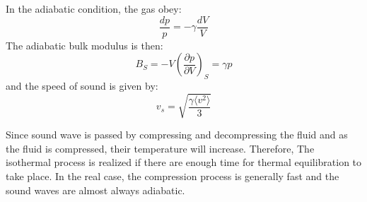 \documentclass{article}
\newcommand{\pfrac}[2]{\frac{\partial #1}{\partial #2}}
\begin{document}
In the adiabatic condition, the gas obey:
\begin{equation}
    \frac{dp}{p} = -\gamma \frac{dV}{V}
\end{equation}
The adiabatic bulk modulus is then:
\begin{equation}
    B_S = -V \left( \pfrac{p}{V} \right)_S = \gamma p
\end{equation}
and the speed of sound is given by:
\begin{equation}
    v_s = \sqrt{\frac{\gamma\langle v^2 \rangle }{3}}    
\end{equation}

Since sound wave is passed by compressing and decompressing the fluid and as the fluid is compressed, their 
temperature will increase. Therefore,
The isothermal process is realized if there are enough time for thermal equilibration to take place.  
In the real case, the compression process is generally fast and the sound waves are almost always adiabatic.
\end{document}
